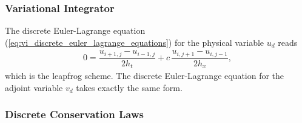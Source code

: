 \documentclass[12pt,a4paper,reqno]{article}
\begin{document}
\subsubsection*{Variational Integrator}

The discrete Euler-Lagrange equation (\ref{eq:vi_discrete_euler_lagrange_equations}) for the physical variable ${\ensuremath{{\ensuremath{{u}}}}}_{d}$ reads
\begin{align}\label{eq:linear_advection_integrator_leapfrog}
0 = \dfrac{u_{i+1, j} - u_{i-1, j}}{2 h_{t}} + c \, \dfrac{u_{i, j+1} - u_{i, j-1}}{2 h_{x}} ,
\end{align}
which is the leapfrog scheme.
The discrete Euler-Lagrange equation for the adjoint variable ${\ensuremath{{\ensuremath{{v}}}}}_{d}$ takes exactly the same form.

\subsubsection*{Discrete Conservation Laws}
\end{document}
